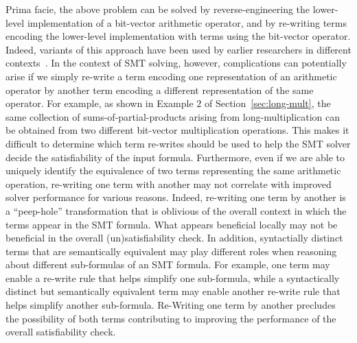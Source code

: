 Prima facie, the above problem can be solved by reverse-engineering
the lower-level implementation of a bit-vector arithmetic operator,
and by re-writing terms encoding the lower-level implementation with
terms using the bit-vector operator.  Indeed, variants of this
approach have been used by earlier researchers in different
contexts~\cite{kunz,ciesielski,kolbl,reveng,earlier-pat-match-synopsys}.
In the context of SMT solving, however, complications can potentially
arise if we simply re-write a term encoding one representation of an
arithmetic operator by another term encoding a different
representation of the same operator. For example, as shown in Example
$2$ of Section~\ref{sec:long-mult}, the same collection of
sums-of-partial-products arising from long-multiplication can be
obtained from two different bit-vector multiplication operations.
This makes it difficult to determine which term re-writes should be
used to help the SMT solver decide the satisfiability of the input
formula.  Furthermore, even if we are able to uniquely identify the
equivalence of two terms representing the same arithmetic operation,
re-writing one term with another may not correlate with improved solver
performance for various reasons.  Indeed, re-writing one term by
another is a ``peep-hole'' transformation that is oblivious of the
overall context in which the terms appear in the SMT formula.  What
appears beneficial locally may not be beneficial in the overall
(un)satisfiability check.  In addition, syntactially distinct terms
that are semantically equivalent may play different roles when
reasoning about different sub-formulas of an SMT formula.  For
example, one term may enable a re-write rule that helps simplify one
sub-formula, while a syntactically distinct but semantically
equivalent term may enable another re-write rule that helps simplify
another sub-formula. Re-Writing one term by another precludes the
possibility of both terms contributing to improving the performance of
the overall satisfiability check.

